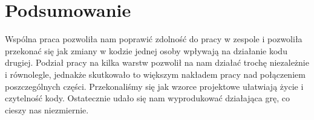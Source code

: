 \documentclass[a4paper, 11pt]{article}
\begin{document}
	
	
	
	\section{Podsumowanie}
	Wspólna praca pozwoliła nam poprawić zdolność do pracy w zespole i pozwoliła przekonać się jak zmiany w kodzie jednej osoby wpływają na działanie kodu drugiej. Podział pracy na kilka warstw pozwolił na nam działać trochę niezależnie i równolegle, jednakże skutkowało to większym nakładem pracy nad połączeniem poszczególnych części. Przekonaliśmy się jak  wzorce projektowe ułatwiają życie i czytelność kody. Ostatecznie udało się nam wyprodukować działająca grę, co cieszy nas niezmiernie.
	
\end{document}
